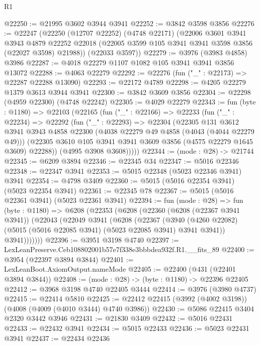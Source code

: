 \begin{lexlean}{R1}
\begin{coremodule}
@22250 := @21995 @3602 @3944 @3941
@22252 := @3842 @3598 @3856
@22276 := @22247
    (@22250
      (@12707 @22252)
      (@4748 @22171)
      (@22006
        @3601
        @3941
        @3943
        @4879
        @22252
        @22018
        (@22005 @3599 @105 @3941 @3941 @3598 @3856 (@22027 @3598) @21988))
      (@22033 @3597))
@22279 := @3976 (@3983 @4858) @3986
@22287 := @4018 @22279 @1107 @1082 @105 @3941 @3941 @3856 @13072
@22288 := @4063 @22279
@22292 := @22276 (fun ("_" : @22173) => @22287 @22288 @13090)
@22293 := @22172 @4789
@22298 := @4205 @22279 @1379 @3613 @3944 @3941
@22300 := @3842 @3609 @3856
@22304 := @22298 (@4959 @22300) (@4748 @22242)
@22305 := @4029 @22279
@22343 := fun (byte : @1180) =>
  @22103
    (@22165
      (fun ("_" : @22166) =>
      @22233
        (fun ("_" : @22234) =>
        @22292
          (fun ("_" : @22293) =>
          @22304
            (@22305
              @131
              @3612
              @3941
              @3943
              @4858
              @22300
              (@4038 @22279 @49 @4858 (@4043 (@4044 @22279 @49)))
              (@22305 @3610 @105 @3941 @3941 @3609 @3856 (@4575 @22279 @1645 @3609) @22288))
            (@4995 @3908 @3608)))))
@22344 := (mode : @28) -> @21744
@22345 := @6209 @3894
@22346 := @22345 @34
@22347 := @5016 @22346
@22348 := @22347 @3941
@22353 := @5015 @22348 (@5023 @22346 @3941) @3941
@22354 := @4798 @3409
@22360 := @5015 (@5016 @22354 @3941) (@5023 @22354 @3941)
@22361 := @22345 @78
@22367 := @5015 (@5016 @22361 @3941) (@5023 @22361 @3941)
@22394 := fun (mode : @28) =>
  fun (byte : @1180) =>
  @6208
    (@22353
      (@6208
        (@22360
          (@6208 (@22367 @3941 @3941))
          (@22043
            (@22049
              @3941
              (@6208
                (@22367
                  (@3940
                    (@4260 @22082)
                    (@5015 (@5016 @22085 @3941) (@5023 @22085 @3941) @3941 @3941))
                  @3941)))))))
@22396 := @3951 @3198 @4740
@22397 := LexLeanPreserve.Ceb108802001b57e7f338e3bbbdea932f.R1.__fits_89
@22400 := @3954 (@22397 @3894 @3844)
@22401 := LexLeanBoot.AxiomOutput.nameMode
@22405 := @22400 (@431 (@22401 @3894 @3844))
@22408 := (mode : @28) -> (byte : @1180) -> @22396 @22405
@22412 := @3968 @3198 @4740 @22405 @3444
@22414 := @3976 (@3980 @4737)
@22415 := @22414 @5810
@22425 := @22412 @22415 (@3992 (@4002 @3198)) (@4008 (@4009 (@4010 @3444) @4740 @3986))
@22430 := @5086 @22415 @3404 @2320 @3442 @3946
@22431 := @21830 @3409
@22432 := @5016 @22431
@22433 := @22432 @3941
@22434 := @5015 @22433
@22436 := @5023 @22431 @3941
@22437 := @22434 @22436

\end{coremodule}
\end{lexlean}
